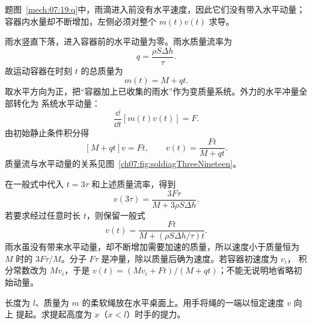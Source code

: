 {\begin{origexamplebox}{}
\begin{qualityfigure}
\label{mech:07:19:q}
\end{qualityfigure}
\end{origexamplebox}

\begin{xesolution}题图~\ref{mech:07:19:q}中，雨滴进入前没有水平速度，因此它们没有带入水平动量；容器内水量却不断增加，左侧必须对整个 $m(t)v(t)$ 求导。

雨水竖直下落，进入容器前的水平动量为零。雨水质量流率为
\[
 q=\frac{\rho S\Delta h}{\tau}.
\]
故运动容器在时刻 $t$ 的总质量为
\[
 m(t)=M+qt.
\]
取水平方向为正，把“容器加上已收集的雨水”作为变质量系统。外力的水平冲量全部转化为
系统水平动量：
\[
 \frac{\dd}{\dd t}[m(t)v(t)]=F.
\]
由初始静止条件积分得
\[
 [M+qt]v=Ft,
 \qquad
 v(t)=\frac{Ft}{M+qt}.
\]
质量流与水平动量的关系见图~\ref{ch07:fig:soldiagThreeNineteen}。

\soldiagThreeNineteen
在一般式中代入 $t=3\tau$ 和上述质量流率，得到
\[
 \boxed{v(3\tau)=\frac{3F\tau}{M+3\rho S\Delta h}}.
\]
若要求经过任意时长 $t$，则保留一般式
\[
 \boxed{v(t)=\frac{Ft}{M+(\rho S\Delta h/\tau)t}}.
\]
雨水虽没有带来水平动量，却不断增加需要加速的质量，所以速度小于质量恒为 $M$ 时的
$3F\tau/M$。分子 $F\tau$ 是冲量，除以质量后确为速度。若容器初速度为 $v_i$，
积分常数改为 $Mv_i$，于是 $v(t)=(Mv_i+Ft)/(M+qt)$；不能无说明地省略初始动量。
\end{xesolution}

\begin{origexamplebox}{}\label{ch07:ex:s08-3-20}
长度为 $l$、质量为 $m$ 的柔软绳放在水平桌面上。用手将绳的一端以恒定速度 $v$ 向上
提起。求提起高度为 $x$（$x<l$）时手的提力。

\begin{qualityfigure}
\label{mech:07:20:q}
\end{qualityfigure}
\end{origexamplebox}

}
